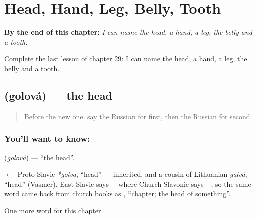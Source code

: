 
\chapter{Head, Hand, Leg, Belly, Tooth}
\label{ch:ru-head-hand-leg-belly-tooth}

\begin{chapteropening}
\textbf{By the end of this chapter:} \emph{I can name the head, a hand, a leg, the belly and a tooth.}

Complete the last lesson of chapter 29: I can name the head, a hand, a leg, the belly and a tooth.
\end{chapteropening}

\section[\texorpdfstring{\ru{голова} (golová)}{голова (golová)}]{ (golová) — the head}

\label{lesson:RU-C29-head}



\begin{quote}
Before the new one: say the Russian for first, then the Russian for second.
\end{quote}

\subsection*{You'll want to know: }
\textbf{} (\emph{golová}) — \textquotedblleft{}the head\textquotedblright{}.

\begin{cousinweb}
\textbf{} $\leftarrow$ Proto-Slavic \emph{*golva}, \textquotedblleft{}head\textquotedblright{} — inherited, and a cousin of Lithuanian \emph{galvà}, \textquotedblleft{}head\textquotedblright{} (Vasmer). East Slavic says \emph{--} where Church Slavonic says \emph{--}, so the same word came back from church books as \emph{}, \textquotedblleft{}chapter; the head of something\textquotedblright{}.
\end{cousinweb}

\begin{grammarlens}[title={What you've built}]
One more word for this chapter.
\end{grammarlens}

